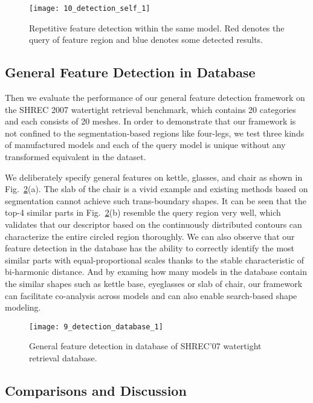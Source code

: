\begin{figure}[!to]
\begin{center}
\texttt{[image: 10\_detection\_self\_1]}
\end{center}
\caption{Repetitive feature detection within the same
    model. Red denotes the query of feature region and blue denotes
    some detected results.}
\label{detect_self}
\end{figure}

\subsection{General Feature Detection in Database}
Then we evaluate the performance of our general feature detection
framework on the SHREC 2007 watertight retrieval benchmark, which
contains 20 categories and each consists of 20 meshes. In order to
demonstrate that our framework is not confined to the
segmentation-based regions like four-legs, we test three kinds of
manufactured models and each of the query model is unique without
any transformed equivalent in the dataset.

We deliberately specify general features on kettle, glasses, and chair
as shown in Fig.~\ref{detect_database_1}(a). The slab
of the chair is a vivid example and existing methods based on
segmentation cannot achieve such trans-boundary shapes. It can be seen
that the top-4 similar parts in Fig.~\ref{detect_database_1}(b) resemble
the query region very well, which validates that our descriptor based
on the continuously distributed contours can characterize the entire
circled region thoroughly. We can also observe that our feature detection
in the database has the ability to correctly identify the most similar
parts with equal-proportional scales thanks to the stable characteristic
of bi-harmonic distance. And by examing how many models in the database
contain the similar shapes such as kettle base, eyeglasses or slab of
chair, our framework can facilitate co-analysis across models and can
also enable search-based shape modeling.


\begin{figure}[!to]
\centering
\texttt{[image: 9\_detection\_database\_1]}
\caption{General feature detection in database of
    SHREC'07 watertight retrieval database.}
\label{detect_database_1}
\end{figure}


\subsection{Comparisons and Discussion}
\label{sec:App}

